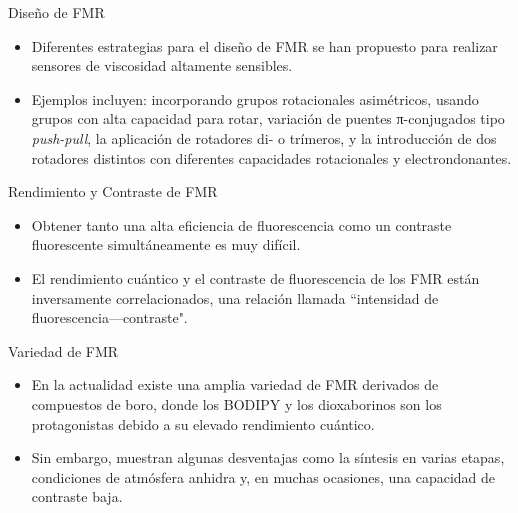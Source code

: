 \documentclass[%
spanish,
mexico]{beamer}
\begin{document}
\begin{frame}{Diseño de FMR}
    \begin{itemize}[<+- | alert@+>]
        \item Diferentes estrategias para el diseño de \gls{FMR} se han propuesto para realizar sensores de viscosidad altamente sensibles.
        \item Ejemplos incluyen: incorporando grupos rotacionales asimétricos, usando grupos con alta capacidad para rotar, variación de puentes π-conjugados tipo \emph{push-pull}, la aplicación de rotadores di- o trímeros, y la introducción de dos rotadores distintos con diferentes capacidades rotacionales y electrondonantes.
    \end{itemize}
\end{frame}

\begin{frame}{Rendimiento y Contraste de FMR}
    \begin{itemize}[<+- | alert@+>]
        \item Obtener tanto una alta eficiencia de fluorescencia como un contraste fluorescente simultáneamente es muy difícil.
        \item El rendimiento cuántico y el contraste de fluorescencia de los \gls{FMR} están inversamente correlacionados, una relación llamada ``intensidad de fluorescencia---contraste".
    \end{itemize}
\end{frame}

\begin{frame}{Variedad de FMR}
    \begin{itemize}
        \item En la actualidad existe una amplia variedad de \gls{FMR} derivados de compuestos de boro, donde los \gls{BODIPY} y los dioxaborinos son los protagonistas debido a su elevado rendimiento cuántico.
        \item Sin embargo, muestran algunas desventajas como la síntesis en varias etapas, condiciones de atmósfera anhidra y, en muchas ocasiones, una capacidad de contraste baja.
    \end{itemize}
\end{frame}
\end{document}
